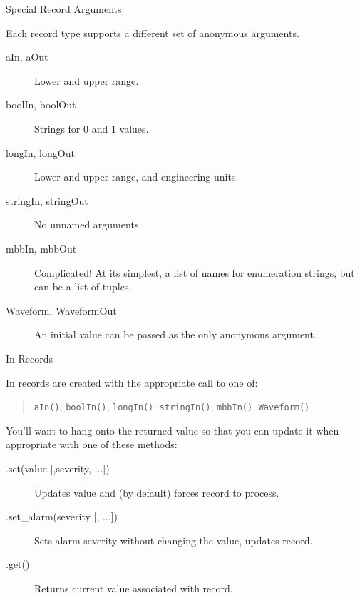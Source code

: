 \documentclass{beamer}
\begin{document}
%
\begin{frame}{Special Record Arguments}

Each record type supports a different set of anonymous arguments.

\begin{description}
\item[aIn, aOut] Lower and upper range.
\item[boolIn, boolOut] Strings for 0 and 1 values.
\item[longIn, longOut] Lower and upper range, and engineering
units\footnotemark.
\item[stringIn, stringOut] No unnamed arguments.
\item[mbbIn, mbbOut] Complicated!  At its simplest, a list of names for
enumeration strings, but can be a list of tuples.
\item[Waveform, WaveformOut] An initial value can be passed as the only
anonymous argument.
\end{description}


\end{frame}


%
\begin{frame}{In Records}

In records are created with the appropriate call to one of:

\begin{quote}
\texttt{aIn()}, \texttt{boolIn()}, \texttt{longIn()}, \texttt{stringIn()},
\texttt{mbbIn()}, \texttt{Waveform()}
\end{quote}

You'll want to hang onto the returned value so that you can update it when
appropriate with one of these methods:

\begin{description}
\item[.set(value [,severity, ...{]})]
Updates value and (by default) forces record to process.
\item[.set\_alarm(severity [, ...{]})]
Sets alarm severity without changing the value, updates record.
\item[.get()]
Returns current value associated with record.
\end{description}

\end{frame}
\end{document}
